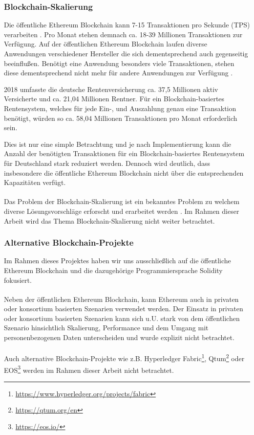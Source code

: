 \subsubsection{Blockchain-Skalierung}
Die öffentliche Ethereum Blockchain kann 7-15 Transaktionen pro Sekunde (TPS) verarbeiten \cite{vitalikscale}. Pro Monat stehen demnach ca. 18-39 Millionen Transaktionen zur Verfügung. Auf der öffentlichen Ethereum Blockchain laufen diverse Anwendungen verschiedener Hersteller die sich dementsprechend auch gegenseitig beeinflußen. Benötigt eine Anwendung besonders viele Transaktionen, stehen diese dementsprechend nicht mehr für andere Anwendungen zur Verfügung \cite{cryptokitty}.  

2018 umfasste die deutsche Rentenversicherung ca. 37,5 Millionen aktiv Versicherte und ca. 21,04 Millionen Rentner. \cite{rente2018,rentezahlen2019} Für ein Blockchain-basiertes Rentensystem, welches für jede Ein-, und Auszahlung genau eine Transaktion benötigt, würden so ca. 58,04 Millionen Transaktionen pro Monat erforderlich sein.

Dies ist nur eine simple Betrachtung und je nach Implementierung kann die Anzahl der benötigten Transaktionen für ein Blockchain-basiertes Rentensystem für Deutschland stark reduziert werden. Dennoch wird deutlich, dass insbesondere die öffentliche Ethereum Blockchain nicht über die entsprechenden Kapazitäten verfügt.

\paragraph*{}
Das Problem der Blockchain-Skalierung ist ein bekanntes Problem zu welchem diverse Lösungsvorschläge erforscht und erarbeitet werden \cite{scaling}. Im Rahmen dieser Arbeit wird das Thema Blockchain-Skalierung nicht weiter betrachtet.

\subsubsection{Alternative Blockchain-Projekte}
Im Rahmen dieses Projektes haben wir uns ausschließlich auf die öffentliche Ethereum Blockchain und die dazugehörige Programmiersprache Solidity fokusiert.

\paragraph*{}
Neben der öffentlichen Ethereum Blockchain, kann Ethereum auch in privaten oder konsortium basierten Szenarien verwendet werden. Der Einsatz in privaten oder konsortium basierten Szenarien kann sich u.U. stark von dem öffentlichen Szenario hinsichtlich Skalierung, Performance und dem Umgang mit personenbezogenen Daten unterscheiden und wurde explizit nicht betrachtet.

\paragraph*{}
Auch alternative Blockchain-Projekte wie z.B. 
Hyperledger Fabric\footnote{\url{https://www.hyperledger.org/projects/fabric}}, 
Qtum\footnote{\url{https://qtum.org/en}}
oder EOS\footnote{\url{https://eos.io/}}
werden im Rahmen dieser Arbeit nicht betrachtet. 